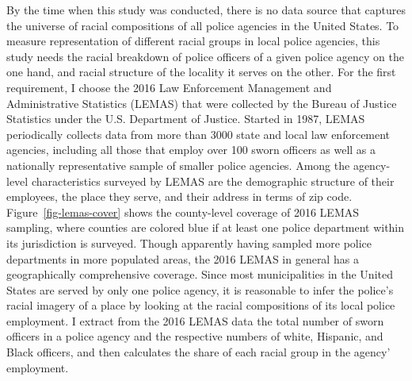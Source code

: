 \documentclass[
  12pt,
]{article}
\begin{document}
By the time when this study was conducted, there is no data source that
captures the universe of racial compositions of all police agencies in
the United States. To measure representation of different racial groups
in local police agencies, this study needs the racial breakdown of
police officers of a given police agency on the one hand, and racial
structure of the locality it serves on the other. For the first
requirement, I choose the 2016 Law Enforcement Management and
Administrative Statistics (LEMAS) that were collected by the Bureau of
Justice Statistics under the U.S. Department of Justice. Started in
1987, LEMAS periodically collects data from more than 3000 state and
local law enforcement agencies, including all those that employ over 100
sworn officers as well as a nationally representative sample of smaller
police agencies. Among the agency-level characteristics surveyed by
LEMAS are the demographic structure of their employees, the place they
serve, and their address in terms of zip code.
Figure~\ref{fig-lemas-cover} shows the county-level coverage of 2016
LEMAS sampling, where counties are colored blue if at least one police
department within its jurisdiction is surveyed. Though apparently having
sampled more police departments in more populated areas, the 2016 LEMAS
in general has a geographically comprehensive coverage. Since most
municipalities in the United States are served by only one police
agency, it is reasonable to infer the police's racial imagery of a place
by looking at the racial compositions of its local police employment. I
extract from the 2016 LEMAS data the total number of sworn officers in a
police agency and the respective numbers of white, Hispanic, and Black
officers, and then calculates the share of each racial group in the
agency' employment.
\end{document}
